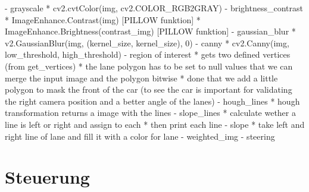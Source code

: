 - grayscale
    * cv2.cvtColor(img, cv2.COLOR_RGB2GRAY)
- brightness_contrast
    * ImageEnhance.Contrast(img)                [PILLOW funktion]
    * ImageEnhance.Brightness(contrast_img)     [PILLOW funktion]
- gaussian_blur
    * v2.GaussianBlur(img, (kernel_size, kernel_size), 0)
- canny
    * cv2.Canny(img, low_threshold, high_threshold)
- region of interest
    * gets two defined vertices (from get_vertices)
    * the lane polygon has to be set to null values that we can merge the input image and the polygon bitwise
    * done that we add a little polygon to mask the front of the car 
        (to see the car is important for validating the right camera position and a better angle of the lanes)
- hough_lines
    * hough transformation returns a image with the lines
- slope_lines
    * calculate wether a line is left or right and assign to each
    * then print each line
- slope
    * take left and right line of lane and fill it with a color for lane
- weighted_img
- steering


\section{Steuerung} %

